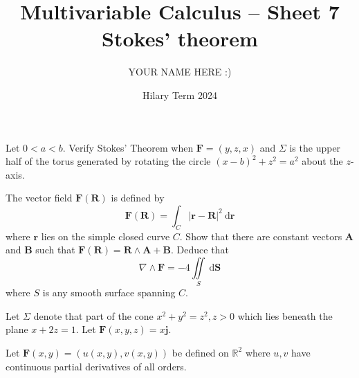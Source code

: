 \documentclass[answers]{exam}
\title{Multivariable Calculus -- Sheet 7\\Stokes' theorem}
\author{YOUR NAME HERE :)}
\date{Hilary Term 2024}
\begin{document}
\maketitle
\begin{questions}

\question%
Let $0<a<b$. Verify Stokes' Theorem when $\mathbf{F}=(y, z, x)$ and $\Sigma$ is the upper half of the torus generated by rotating the circle $(x-b)^{2}+z^{2}=a^{2}$ about the $z$-axis.



\question%
The vector field $\mathbf{F}(\mathbf{R})$ is defined by \[
	\mathbf{F}(\mathbf{R})=\int_{C}|\mathbf{r}-\mathbf{R}|^{2} \mathrm{~d} \mathbf{r}
\] where $\mathbf{r}$ lies on the simple closed curve $C$. Show that there are constant vectors $\mathbf{A}$ and $\mathbf{B}$ such that $\mathbf{F}(\mathbf{R})=\mathbf{R} \wedge \mathbf{A}+\mathbf{B}$. Deduce that \[
	\nabla \wedge \mathbf{F}=-4 \iint\limits_{S} \mathrm{~d} \mathbf{S}
\] where $S$ is any smooth surface spanning $C$.



\question%
Let $\Sigma$ denote that part of the cone $x^{2}+y^{2}=z^{2}, z>0$ which lies beneath the plane $x+2 z=1$. Let $\mathbf{F}(x, y, z)=x \mathbf{j}$.



\question%
Let $\mathbf{F}(x, y)=(u(x, y), v(x, y))$ be defined on $\mathbb{R}^{2}$ where $u, v$ have continuous partial derivatives of all orders.
\begin{parts}

\end{parts}
\end{questions}
\end{document}
